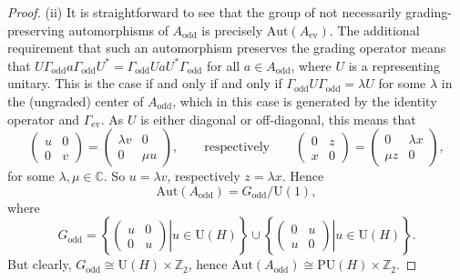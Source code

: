 \documentclass[10pt,a4paper]{amsart}
\numberwithin{equation}{section}
\newcommand{\Z}{\mathbb{Z}}
\newcommand{\C}{\mathbb{C}}
\newcommand{\Aut}{\mathrm{Aut}}
\newcommand{\U}{\mathrm{U}}
\begin{document}
\begin{proof}
(ii) It is straightforward to see that the group of not necessarily grading-preserving automorphisms of $A_{\mathrm{odd}}$ is precisely $\Aut(A_{\mathrm{ev}})$.
The additional requirement that such an automorphism preserves the grading operator means that $U \Gamma_{\mathrm{odd}} a \Gamma_{\mathrm{odd}} U^* = \Gamma_{\mathrm{odd}} U a U^* \Gamma_{\mathrm{odd}}$ for all $a \in A_{\mathrm{odd}}$, where $U$ is a representing unitary.
This is the case if and only if and only if $\Gamma_{\mathrm{odd}} U \Gamma_{\mathrm{odd}} = \lambda U$ for some $\lambda$ in the (ungraded) center of $A_{\mathrm{odd}}$, which in this case is generated by the identity operator and $\Gamma_{\mathrm{ev}}$.
As $U$ is either diagonal or off-diagonal, this means that
 \begin{equation*}
 	\begin{pmatrix} u & 0 \\ 0 & v \end{pmatrix} = \begin{pmatrix} \lambda v & 0 \\ 0 & \mu u \end{pmatrix}, \qquad \text{respectively} \qquad \begin{pmatrix} 0 & z \\ x & 0 \end{pmatrix} = \begin{pmatrix} 0 & \lambda x \\ \mu z& 0 \end{pmatrix},
 \end{equation*}
 for some $\lambda, \mu \in \C$.
 So $u = \lambda v$, respectively $z = \lambda x$.
 Hence
\begin{equation*} %
 \Aut(A_{\mathrm{odd}}) = G_{\mathrm{odd}} / \U(1),
\end{equation*}
where
\begin{equation} \label{DefGodd}
 G_{\mathrm{odd}} = \left\{ \left.\begin{pmatrix} u & 0 \\ 0 & u \end{pmatrix} \right| u \in \U(H)\right\} \cup \left\{ \left.\begin{pmatrix} 0 & u \\ u & 0 \end{pmatrix} \right| u \in \U(H)\right\}.
\end{equation}
But clearly, $G_{\mathrm{odd}} \cong \U(H) \times \Z_2$, hence $\Aut(A_{\mathrm{odd}}) \cong \mathrm{PU}(H) \times \Z_2$.
\end{proof}
\end{document}
